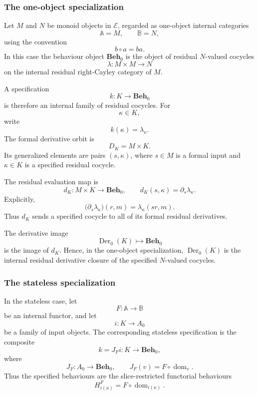\subsubsection{The one-object specialization}

Let \(M\) and \(N\) be monoid objects in \(\mathcal E\), regarded as one-object internal categories
\[
    \mathbb A=M,
    \qquad
    \mathbb B=N,
\]
using the convention
\[
    b\circ a=ba.
\]
In this case the behaviour object \(\mathbf{Beh}_0\) is the object of residual \(N\)-valued cocycles
\[
    \lambda:M\times M\to N
\]
on the internal residual right-Cayley category of \(M\).

A specification
\[
    k:K\to\mathbf{Beh}_0
\]
is therefore an internal family of residual cocycles. For
\[
    \kappa\in K,
\]
write
\[
    k(\kappa)=\lambda_\kappa.
\]
The formal derivative orbit is
\[
    D_K=M\times K.
\]
Its generalized elements are pairs \((s,\kappa)\), where \(s\in M\) is a formal input and \(\kappa\in K\) is a specified residual cocycle.

The residual evaluation map is
\[
    d_K:M\times K\to \mathbf{Beh}_0,
    \qquad
    d_K(s,\kappa)=\partial_s\lambda_\kappa.
\]
Explicitly,
\[
    \bigl(\partial_s\lambda_\kappa\bigr)(r,m)
        =
    \lambda_\kappa(sr,m).
\]
Thus \(d_K\) sends a specified cocycle to all of its formal residual derivatives.

The derivative image
\[
    \operatorname{Der}_0(K)
        \rightarrowtail
    \mathbf{Beh}_0
\]
is the image of \(d_K\). Hence, in the one-object specialization, \(\operatorname{Der}_0(K)\) is the internal residual derivative closure of the specified \(N\)-valued cocycles.

\subsubsection{The stateless specialization}

In the stateless case, let
\[
    F:\mathbb A\to\mathbb B
\]
be an internal functor, and let
\[
    i:K\to A_0
\]
be a family of input objects. The corresponding stateless specification is the composite
\[
    k
        =
    J_F i:
    K\to \mathbf{Beh}_0,
\]
where
\[
    J_F:A_0\to \mathbf{Beh}_0,
    \qquad
    J_F(v)=F\circ\operatorname{dom}_v.
\]
Thus the specified behaviours are the slice-restricted functorial behaviours
\[
    H^F_{i(\kappa)}
        =
    F\circ\operatorname{dom}_{i(\kappa)}.
\]

